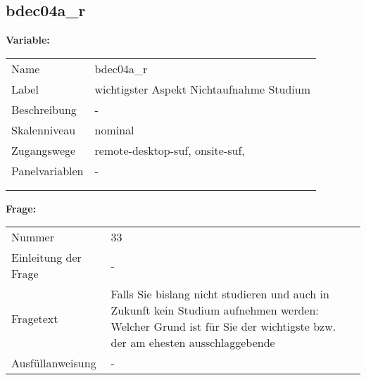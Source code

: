 	
	
	\subsection{bdec04a\_r}
	\label{subSection:bdec04a_r}

	\noindent\textbf{Variable:}\\
		\begin{tabular}{lL{11.3cm}}
			\label{tableVariable:bdec04a_r}
			Name & bdec04a\_r \\
			Label & wichtigster Aspekt Nichtaufnahme Studium \\
			Beschreibung & - \\
			Skalenniveau & nominal \\
			Zugangswege &
				remote-desktop-suf,
				onsite-suf,
 \\
			Panelvariablen & -
			 \\
			 \\
 \\
		\end{tabular}

		\vspace*{1 cm}
		\noindent\textbf{Frage:}\\
		\begin{tabular}{lL{11.3cm}}
			\label{tableQuestion:bdec04a_r}
			Nummer & 33 \\
			Einleitung der Frage & - \\
			Fragetext & Falls Sie bislang nicht studieren und auch in Zukunft kein Studium aufnehmen werden: Welcher Grund ist für Sie der wichtigste bzw. der am ehesten ausschlaggebende \\
			Ausfüllanweisung & - \\
		\end{tabular}





